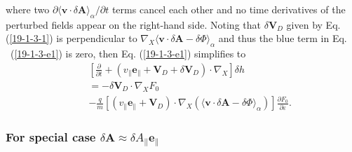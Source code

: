 \documentclass{article}
\begin{document}
where two $\partial \langle \mathbf{v} \cdot \delta \mathbf{A}
\rangle_{\alpha} / \partial t$ terms cancel each other and no time derivatives
of the perturbed fields appear on the right-hand side. Noting that $\delta
\mathbf{V}_D$ given by Eq. (\ref{19-1-3-1}) is perpendicular to $\nabla_X
\langle \mathbf{v} \cdot \delta \mathbf{A}- \delta \Phi \rangle_{\alpha}$ and
thus the blue term in Eq. \ (\ref{19-1-3-e1}) is zero, then Eq.
(\ref{19-1-3-e1}) simplifies to
\begin{eqnarray}
  &  & \left[ \frac{\partial}{\partial t} + (v_{\parallel}
  \mathbf{e}_{\parallel} +\mathbf{V}_D + \delta \mathbf{V}_D) \cdot \nabla_X
  \right] \delta h \nonumber\\
  &  & = - \delta \mathbf{V}_D \cdot \nabla_X F_0 \nonumber\\
  &  & - \frac{q}{m} [(v_{\parallel} \mathbf{e}_{\parallel} +\mathbf{V}_D)
  \cdot \nabla_X (\langle \mathbf{v} \cdot \delta \mathbf{A}- \delta \Phi
  \rangle_{\alpha})] \frac{\partial F_0}{\partial \varepsilon} . 
  \label{19-1-4-e1}
\end{eqnarray}

\subsubsection{For special case $\delta \mathbf{A} \approx \delta
A_{\parallel} \mathbf{e}_{\parallel}$}
\end{document}
